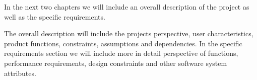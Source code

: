 
In the next two chapters we will include an overall description of the project as well as the specific requirements. 

The overall description will include the projects perspective, user characteristics, product functions, constraints, assumptions and dependencies. 
In the specific requirements section we will include more in detail perspective of functions, performance requirements, design constraints and other software system attributes.
